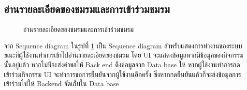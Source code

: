 \documentclass[14pt,oneside,openright,a4paper]{cpe-thai-project}
\begin{document}
\newpage

\subsection{อ่านรายละเอียดของชมรมและการเข้าร่วมชมรม}

  \begin{figure}[!h]\centering
    \setlength{\fboxrule}{0.5mm} %
    \setlength{\fboxsep}{0.5cm}
    \caption{อ่านรายละเอียดของชมรมและการเข้าร่วมชมรม}\label{fig:Select and join club}
  \end{figure}

  จาก Sequence diagram ในรูปที่ \ref{fig:Select and join club} เป็น Sequence diagram สำหรับแสดงการทำงานของระบบขณะที่ผู้ใช้งานทำการเข้าไปอ่านรายละเอียดของชมรม โดย UI จะแสดงข้อมูลหากมีข้อมูลของกิจกรรมนั้นอยู่แล้ว หากไม่มีจะส่งคำขอให้ Back end ดึงข้อมูลจาก Data base ให้ หากผู้ใช้งานทำการกดเข้าร่วมกิจกรรม UI จะทำการขอการยืนยันจากผู้ใช้งานอีกครั้ง ซึ่งหากกดยืนยันแล้วก็จะส่งข้อมูลการเข้าร่วมไปให้ Backend จัดเก็บใน Data base
\end{document}
